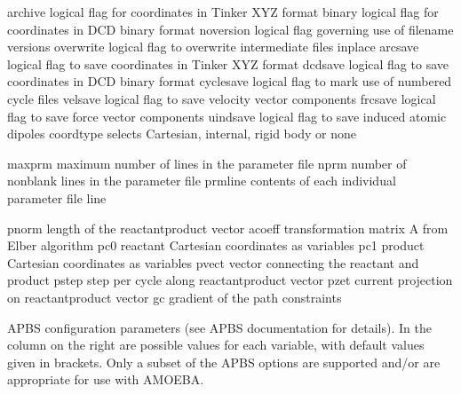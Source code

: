 \documentclass[letterpaper,11pt,english]{sphinxmanual}
\begin{document}
\begin{sphinxVerbatim}[commandchars=\\\{\}]
archive         logical flag for coordinates in Tinker XYZ format
binary          logical flag for coordinates in DCD binary format
noversion       logical flag governing use of filename versions
overwrite       logical flag to overwrite intermediate files inplace
arcsave         logical flag to save coordinates in Tinker XYZ format
dcdsave         logical flag to save coordinates in DCD binary format
cyclesave       logical flag to mark use of numbered cycle files
velsave         logical flag to save velocity vector components
frcsave         logical flag to save force vector components
uindsave        logical flag to save induced atomic dipoles
coordtype       selects Cartesian, internal, rigid body or none
\end{sphinxVerbatim}

\sphinxAtStartPar
{}

\begin{sphinxVerbatim}[commandchars=\\\{\}]
maxprm          maximum number of lines in the parameter file
nprm            number of nonblank lines in the parameter file
prmline         contents of each individual parameter file line
\end{sphinxVerbatim}

\sphinxAtStartPar
{}

\begin{sphinxVerbatim}[commandchars=\\\{\}]
pnorm           length of the reactant\PYGZhy{}product vector
acoeff          transformation matrix \PYGZsq{}A\PYGZsq{} from Elber algorithm
pc0             reactant Cartesian coordinates as variables
pc1             product Cartesian coordinates as variables
pvect           vector connecting the reactant and product
pstep           step per cycle along reactant\PYGZhy{}product vector
pzet            current projection on reactant\PYGZhy{}product vector
gc              gradient of the path constraints
\end{sphinxVerbatim}

\sphinxAtStartPar
{}

\sphinxAtStartPar
APBS configuration parameters (see APBS documentation for details). In
the column on the right are possible values for each variable, with default
values given in brackets. Only a subset of the APBS options are supported
and/or are appropriate for use with AMOEBA.
\end{document}
